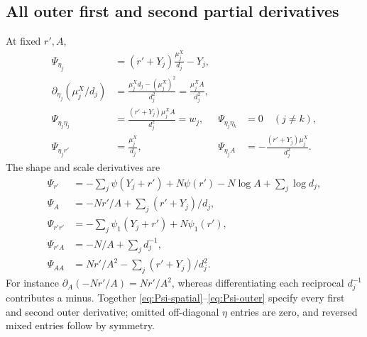\documentclass[11pt,a4paper]{article}
\numberwithin{equation}{section}
\begin{document}
\subsection{All outer first and second partial derivatives}
At fixed ${r'},A$,
\begin{align}
 \Psi_{\eta_j}&=({r'}+Y_j)\frac{\mu_j^X}{d_j}-Y_j,\\
 \partial_{\eta_j}(\mu_j^X/d_j)&=\frac{\mu_j^Xd_j-(\mu_j^X)^2}{d_j^2}
                                  =\frac{\mu_j^XA}{d_j^2},\\
 \Psi_{\eta_j\eta_j}&=\frac{({r'}+Y_j)\mu_j^XA}{d_j^2}=w_j,&
 \Psi_{\eta_j\eta_k}&=0\quad(j\ne k),\\
 \Psi_{\eta_j{r'}}&=\frac{\mu_j^X}{d_j},&
 \Psi_{\eta_j A}&=-\frac{({r'}+Y_j)\mu_j^X}{d_j^2}. \label{eq:Psi-spatial}
\end{align}
The shape and scale derivatives are
\begin{align}
 \Psi_{r'}&=-\sum_j\psi(Y_j+{r'})+N\psi({r'})
                         -N\log A+\sum_j\log d_j,\\
 \Psi_A&=-N{r'}/A+\sum_j({r'}+Y_j)/d_j,\\
 \Psi_{{r'}{r'}}&=-\sum_j\psi_1(Y_j+{r'})+N\psi_1({r'}),\\
 \Psi_{{r'} A}&=-N/A+\sum_jd_j^{-1},\\
 \Psi_{AA}&=N{r'}/A^2-\sum_j({r'}+Y_j)/d_j^2. \label{eq:Psi-outer}
\end{align}
For instance $\partial_A(-N{r'}/A)=N{r'}/A^2$,
whereas differentiating each reciprocal $d_j^{-1}$ contributes a minus.
Together \eqref{eq:Psi-spatial}--\eqref{eq:Psi-outer} specify every
first and second outer derivative; omitted off-diagonal $\eta$ entries
are zero, and reversed mixed entries follow by symmetry.
\end{document}
